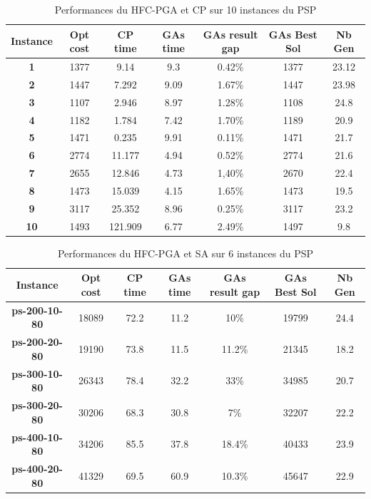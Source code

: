\documentclass[12pt,a4paper]{article}
\begin{document}
	\begin{table}[h]
		\centering
		\begin{tabular}{|c|c|c|c|c|c|c|}
			\hline
			\textbf{Instance} & \textbf{Opt cost} & \textbf{CP time} & \textbf{GAs time} & \textbf{GAs result gap} & \textbf{GAs Best Sol} & \textbf{Nb Gen}\\
			\hline
			\textbf{1} & 1377 & 9.14 & 9.3 & 0.42\% & 1377 & 23.12 \\
			\textbf{2} & 1447 & 7.292 & 9.09 & 1.67\% & 1447 & 23.98\\
			\textbf{3} & 1107 & 2.946 & 8.97 & 1.28\% & 1108 & 24.8\\
			\textbf{4} & 1182 & 1.784 & 7.42 & 1.70\% & 1189 & 20.9\\
			\textbf{5} & 1471 & 0.235 & 9.91 & 0.11\% & 1471 & 21.7\\
			\textbf{6} & 2774 & 11.177 & 4.94 & 0.52\% & 2774 & 21.6\\
			\textbf{7} & 2655 & 12.846 & 4.73 & 1,40\% & 2670 & 22.4\\
			\textbf{8} & 1473 & 15.039 & 4.15 & 1.65\% & 1473 & 19.5\\
			\textbf{9} & 3117 & 25.352 & 8.96 & 0.25\% & 3117 & 23.2\\
			\textbf{10} & 1493 & 121.909 & 6.77 & 2.49\% & 1497 & 9.8\\
			\hline
		\end{tabular}	
		\caption{Performances du HFC-PGA et CP sur 10 instances du PSP}	
	\end{table}			
	
	\begin{table}[h]
		\centering
		\begin{tabular}{|c|c|c|c|c|c|c|}
			\hline
			\textbf{Instance} & \textbf{Opt cost} & \textbf{CP time} & \textbf{GAs time} & \textbf{GAs result gap} & \textbf{GAs Best Sol} & \textbf{Nb Gen}\\
			\hline
			\textbf{ps-200-10-80} & 18089 & 72.2 & 11.2 & 10\% & 19799 & 24.4 \\
			\textbf{ps-200-20-80} & 19190 & 73.8 & 11.5 & 11.2\% & 21345 & 18.2 \\
			\textbf{ps-300-10-80} & 26343 & 78.4 & 32.2 & 33\% & 34985 & 20.7 \\
			\textbf{ps-300-20-80} & 30206 & 68.3 & 30.8 & 7\% & 32207 & 22.2 \\
			\textbf{ps-400-10-80} & 34206 & 85.5 & 37.8 & 18.4\% & 40433 & 23.9 \\
			\textbf{ps-400-20-80} & 41329 & 69.5 & 60.9 & 10.3\% & 45647 & 22.9 \\
			\hline
		\end{tabular}	
		\caption{Performances du HFC-PGA et SA sur 6 instances du PSP}	
	\end{table}			
		
\end{document}
